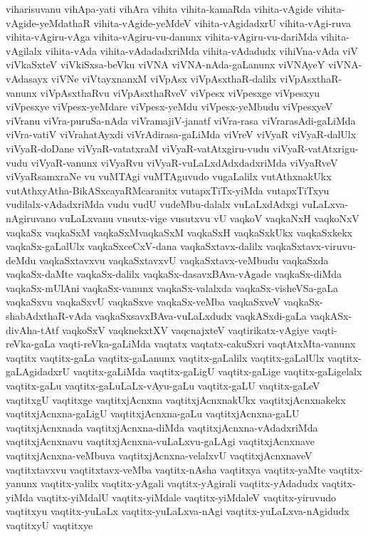 {viharisuvanu
vihApa-yati
vihAra
vihita
vihita-kamaRda
vihita-vAgide
vihita-vAgide-yeMdathaR
vihita-vAgide-yeMdeV
vihita-vAgidadxrU
vihita-vAgi-ruva
vihita-vAgiru-vAga
vihita-vAgiru-vu-danunx
vihita-vAgiru-vu-dariMda
vihita-vAgilalx
vihita-vAda
vihita-vAdadadxriMda
vihita-vAdadudx
vihiVna-vAda
viV
viVkaSxteV
viVkiSxsa-beVku
viVNA
viVNA-nAda-gaLanunx
viVNAyeY
viVNA-vAdasayx
viVNe
viVtayxnanxM
viVpAsx
viVpAsxthaR-dalilx
viVpAsxthaR-vanunx
viVpAsxthaRvu
viVpAsxthaRveV
viVpesx
viVpesxge
viVpesxyu
viVpesxye
viVpesx-yeMdare
viVpesx-yeMdu
viVpesx-yeMbudu
viVpesxyeV
viVranu
viVra-puruSa-nAda
viVramajiV-janatf
viVra-rasa
viVrarasAdi-gaLiMda
viVra-vatiV
viVrahatAyxdi
viVrAdirasa-gaLiMda
viVreV
viVyaR
viVyaR-dalUlx
viVyaR-doDane
viVyaR-vatatxraM
viVyaR-vatAtxgiru-vudu
viVyaR-vatAtxrigu-vudu
viVyaR-vanunx
viVyaRvu
viVyaR-vuLaLxdAdxdadxriMda
viVyaRveV
viVyaRsamxraNe
vu
vuMTAgi
vuMTAguvudo
vugaLalilx
vutAthxnakUkx
vutAthxyAtha-BikASxcayaRMcaranitx
vutapxTiTx-yiMda
vutapxTiTxyu
vudilalx-vAdadxriMda
vudu
vudU
vudeMbu-dalalx
vuLaLxdAdxgi
vuLaLxva-nAgiruvano
vuLaLxvanu
vusutx-vige
vusutxvu
vU
vaqkoV
vaqkaNxH
vaqkoNxV
vaqkaSx
vaqkaSxM
vaqkaSxMvaqkaSxM
vaqkaSxH
vaqkaSxkUkx
vaqkaSxkekx
vaqkaSx-gaLalUlx
vaqkaSxceCxV-dana
vaqkaSxtavx-dalilx
vaqkaSxtavx-viruvu-deMdu
vaqkaSxtavxvu
vaqkaSxtavxvU
vaqkaSxtavx-veMbudu
vaqkaSxda
vaqkaSx-daMte
vaqkaSx-dalilx
vaqkaSx-dasavxBAva-vAgade
vaqkaSx-diMda
vaqkaSx-mUlAni
vaqkaSx-vanunx
vaqkaSx-valalxda
vaqkaSx-visheVSa-gaLa
vaqkaSxvu
vaqkaSxvU
vaqkaSxve
vaqkaSx-veMba
vaqkaSxveV
vaqkaSx-shabAdxthaR-vAda
vaqkaSxsavxBAva-vuLaLxdudx
vaqkASxdi-gaLa
vaqkASx-divAha-tAtf
vaqkoSxV
vaqknekxtXV
vaqcnajxteV
vaqtirikatx-vAgiye
vaqti-reVka-gaLa
vaqti-reVka-gaLiMda
vaqtatx
vaqtatx-cakuSxri
vaqtAtxMta-vanunx
vaqtitx
vaqtitx-gaLa
vaqtitx-gaLanunx
vaqtitx-gaLalilx
vaqtitx-gaLalUlx
vaqtitx-gaLAgidadxrU
vaqtitx-gaLiMda
vaqtitx-gaLigU
vaqtitx-gaLige
vaqtitx-gaLigelalx
vaqtitx-gaLu
vaqtitx-gaLuLaLx-vAyu-gaLu
vaqtitx-gaLU
vaqtitx-gaLeV
vaqtitxgU
vaqtitxge
vaqtitxjAcnxna
vaqtitxjAcnxnakUkx
vaqtitxjAcnxnakekx
vaqtitxjAcnxna-gaLigU
vaqtitxjAcnxna-gaLu
vaqtitxjAcnxna-gaLU
vaqtitxjAcnxnada
vaqtitxjAcnxna-diMda
vaqtitxjAcnxna-vAdadxriMda
vaqtitxjAcnxnavu
vaqtitxjAcnxna-vuLaLxvu-gaLAgi
vaqtitxjAcnxnave
vaqtitxjAcnxna-veMbuva
vaqtitxjAcnxna-velalxvU
vaqtitxjAcnxnaveV
vaqtitxtavxvu
vaqtitxtavx-veMba
vaqtitx-nAsha
vaqtitxya
vaqtitx-yaMte
vaqtitx-yanunx
vaqtitx-yalilx
vaqtitx-yAgali
vaqtitx-yAgirali
vaqtitx-yAdadudx
vaqtitx-yiMda
vaqtitx-yiMdalU
vaqtitx-yiMdale
vaqtitx-yiMdaleV
vaqtitx-yiruvudo
vaqtitxyu
vaqtitx-yuLaLx
vaqtitx-yuLaLxva-nAgi
vaqtitx-yuLaLxva-nAgidudx
vaqtitxyU
vaqtitxye
}
